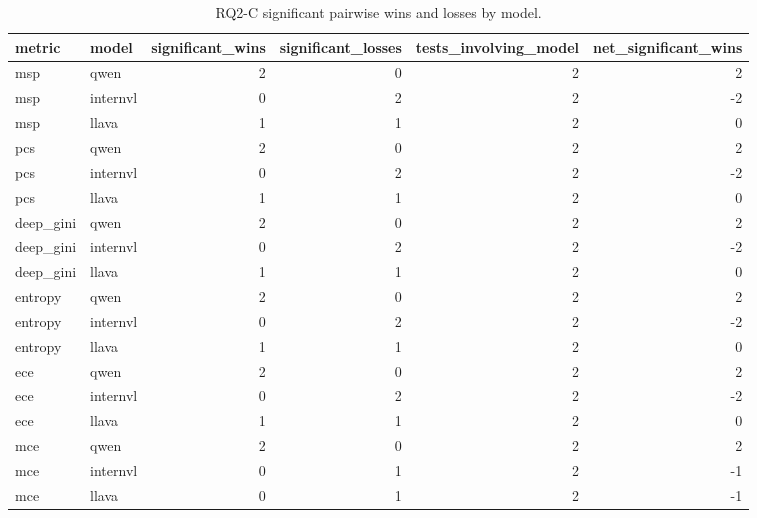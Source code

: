 \begin{table}[tbp]
\caption{RQ2-C significant pairwise wins and losses by model.}
\label{tab:rq2c-model-pairwise-summary}
\begin{tabular}{llrrrr}
\toprule
metric & model & significant\_wins & significant\_losses & tests\_involving\_model & net\_significant\_wins \\
\midrule
msp & qwen & 2 & 0 & 2 & 2 \\
msp & internvl & 0 & 2 & 2 & -2 \\
msp & llava & 1 & 1 & 2 & 0 \\
pcs & qwen & 2 & 0 & 2 & 2 \\
pcs & internvl & 0 & 2 & 2 & -2 \\
pcs & llava & 1 & 1 & 2 & 0 \\
deep\_gini & qwen & 2 & 0 & 2 & 2 \\
deep\_gini & internvl & 0 & 2 & 2 & -2 \\
deep\_gini & llava & 1 & 1 & 2 & 0 \\
entropy & qwen & 2 & 0 & 2 & 2 \\
entropy & internvl & 0 & 2 & 2 & -2 \\
entropy & llava & 1 & 1 & 2 & 0 \\
ece & qwen & 2 & 0 & 2 & 2 \\
ece & internvl & 0 & 2 & 2 & -2 \\
ece & llava & 1 & 1 & 2 & 0 \\
mce & qwen & 2 & 0 & 2 & 2 \\
mce & internvl & 0 & 1 & 2 & -1 \\
mce & llava & 0 & 1 & 2 & -1 \\
\bottomrule
\end{tabular}
\end{table}
